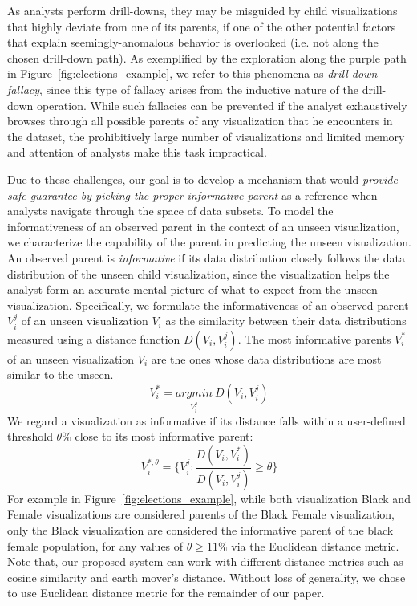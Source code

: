 \par As analysts perform drill-downs, they may be misguided by child visualizations that highly deviate from one of its parents, if one of the other potential factors that explain seemingly-anomalous behavior is overlooked (i.e. not along the chosen drill-down path). As exemplified by the exploration along the purple path in Figure~\ref{fig:elections_example}, we refer to this phenomena as \emph{drill-down fallacy}, since this type of fallacy arises from the inductive nature of the drill-down operation. %
While such fallacies can be prevented if the analyst exhaustively browses through all possible parents of any visualization that he encounters in the dataset, the prohibitively large number of visualizations and limited memory and attention of analysts make this task impractical.
\par Due to these challenges, our goal is to develop a mechanism that would  \emph{provide safe guarantee by picking the proper informative parent} as a reference when analysts navigate through the space of data subsets.  To model the informativeness of an observed parent in the context of an unseen visualization, we characterize the capability of the parent in predicting the unseen visualization. An observed parent is \emph{informative} if its data distribution closely follows the data distribution of the unseen child visualization, since the visualization helps the analyst form an accurate mental picture of what to expect from the unseen visualization. Specifically, we formulate the informativeness of an observed parent $V_i^j$ of an unseen visualization $V_i$ as the similarity between their data distributions measured using a distance function $D(V_i, V_i^j)$. The most informative parents $V_i^*$ of an unseen visualization $V_i$ are the ones whose data distributions are most similar to the unseen.
\begin{equation}
    V_i^*=\underset{V_i^j}{argmin}\ D(V_i, V_i^j)
\end{equation}
We regard a visualization as informative if its distance falls within a user-defined threshold $\theta\%$ close to its most informative parent:
\begin{equation}
    V_i^{*, \theta} = \{V_i^j : \frac{D(V_i, V_i^*)}{D(V_i, V_i^j)} \geq \theta\}
\end{equation}
For example in Figure~\ref{fig:elections_example}, while both visualization Black and Female visualizations are considered parents of the Black Female visualization, only the Black visualization are considered the informative parent of the black female population, for any values of $\theta \geq 11\%$ via the Euclidean distance metric. Note that, our proposed system can work with different distance metrics such as cosine similarity and earth mover's distance. Without loss of generality, we chose to use Euclidean distance metric for the remainder of our paper.
\fi
